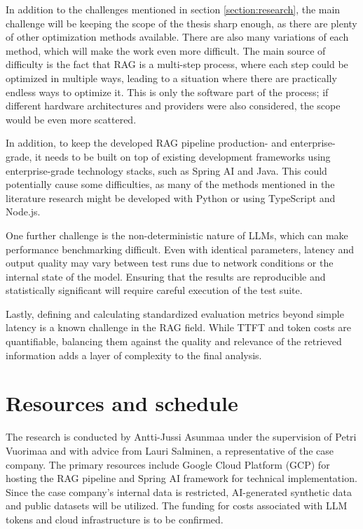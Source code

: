 \documentclass[12pt,a4paper,english,oneside]{article}
\begin{document}
In addition to the challenges mentioned in section \ref{section:research}, the main challenge will be keeping the scope of the thesis sharp enough, as there are plenty of other optimization methods available. There are also many variations of each method, which will make the work even more difficult. The main source of difficulty is the fact that RAG is a multi-step process, where each step could be optimized in multiple ways, leading to a situation where there are practically endless ways to optimize it. This is only the software part of the process; if different hardware architectures and providers were also considered, the scope would be even more scattered.

In addition, to keep the developed RAG pipeline production- and enterprise-grade, it needs to be built on top of existing development frameworks using enterprise-grade technology stacks, such as Spring AI and Java. This could potentially cause some difficulties, as many of the methods mentioned in the literature research might be developed with Python or using TypeScript and Node.js.

One further challenge is the non-deterministic nature of LLMs, which can make performance benchmarking difficult. Even with identical parameters, latency and output quality may vary between test runs due to network conditions or the internal state of the model. Ensuring that the results are reproducible and statistically significant will require careful execution of the test suite.

Lastly, defining and calculating standardized evaluation metrics beyond simple latency is a known challenge in the RAG field. While TTFT and token costs are quantifiable, balancing them against the quality and relevance of the retrieved information adds a layer of complexity to the final analysis.

\section{Resources and schedule}

The research is conducted by Antti-Jussi Asunmaa under the supervision of Petri Vuorimaa and with advice from Lauri Salminen, a representative of the case company. The primary resources include Google Cloud Platform (GCP) for hosting the RAG pipeline and Spring AI framework for technical implementation. Since the case company’s internal data is restricted, AI-generated synthetic data and public datasets will be utilized. The funding for costs associated with LLM tokens and cloud infrastructure is to be confirmed.  
\end{document}
